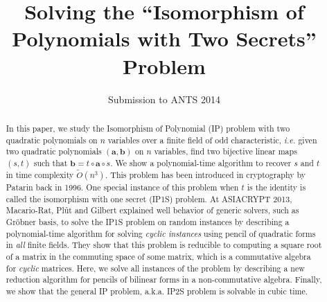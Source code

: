 \documentclass{lms}%
\def\commentaire#1{{\bfseries\textcolor{red}{#1}}}
\begin{document}
\title[Solving ``Isomorphism of Polynomials with Two Secrets'']%
{Solving the ``Isomorphism of Polynomials with Two Secrets'' Problem}%
\author{Submission to ANTS 2014}
\maketitle

\begin{abstract}
In this paper, we study the Isomorphism of Polynomial (IP) problem with two
quadratic polynomials on $n$ variables over a finite field of odd
characteristic, \textit{i.e.} given two quadratic polynomials $(\bm{a},\bm{b})$ 
on $n$ variables, find two bijective linear maps $(s,t)$ such that 
$\bm{b}=t\circ \bm{a}\circ s$. We show a
polynomial-time algorithm to recover $s$ and $t$ in time complexity $\widetilde{O}(n^3)$.
This problem has been introduced in cryptography by Patarin back in 1996.
One special instance of this problem when $t$ is the identity is called
the isomorphism with one secret (IP1S) problem. At ASIACRYPT 2013, Macario-Rat, Pl\^ut and Gilbert
explained well behavior of generic solvers, such as Gr\"obner basis, to
solve the IP1S problem on random instances by describing a polynomial-time
algorithm for solving \textit{cyclic instances} using pencil of quadratic forms 
in \textit{all} finite fields. They show that this problem is
reducible to computing a square root of a matrix in the commuting space of 
some matrix, which is a commutative algebra for \textit{cyclic} matrices. Here, we solve all
instances of the problem by describing a new reduction algorithm for
pencils of bilinear forms in a non-commutative algebra. Finally, we show
that the general IP problem, a.k.a. IP2S problem is solvable in cubic
time.
\end{abstract}
\end{document}
